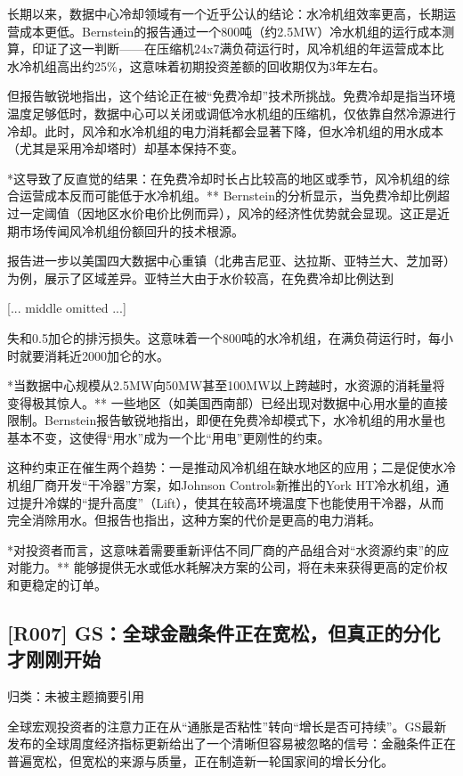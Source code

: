 \documentclass[11pt]{ctexart}
\begin{document}
长期以来，数据中心冷却领域有一个近乎公认的结论：水冷机组效率更高，长期运营成本更低。Bernstein的报告通过一个800吨（约2.5MW）冷水机组的运行成本测算，印证了这一判断——在压缩机24x7满负荷运行时，风冷机组的年运营成本比水冷机组高出约25\%，这意味着初期投资差额的回收期仅为3年左右。

但报告敏锐地指出，这个结论正在被“免费冷却”技术所挑战。免费冷却是指当环境温度足够低时，数据中心可以关闭或调低冷水机组的压缩机，仅依靠自然冷源进行冷却。此时，风冷和水冷机组的电力消耗都会显著下降，但水冷机组的用水成本（尤其是采用冷却塔时）却基本保持不变。

*这导致了反直觉的结果：在免费冷却时长占比较高的地区或季节，风冷机组的综合运营成本反而可能低于水冷机组。** Bernstein的分析显示，当免费冷却比例超过一定阈值（因地区水价电价比例而异），风冷的经济性优势就会显现。这正是近期市场传闻风冷机组份额回升的技术根源。

报告进一步以美国四大数据中心重镇（北弗吉尼亚、达拉斯、亚特兰大、芝加哥）为例，展示了区域差异。亚特兰大由于水价较高，在免费冷却比例达到

[... middle omitted ...]

失和0.5加仑的排污损失。这意味着一个800吨的水冷机组，在满负荷运行时，每小时就要消耗近2000加仑的水。

*当数据中心规模从2.5MW向50MW甚至100MW以上跨越时，水资源的消耗量将变得极其惊人。** 一些地区（如美国西南部）已经出现对数据中心用水量的直接限制。Bernstein报告敏锐地指出，即便在免费冷却模式下，水冷机组的用水量也基本不变，这使得“用水”成为一个比“用电”更刚性的约束。

这种约束正在催生两个趋势：一是推动风冷机组在缺水地区的应用；二是促使水冷机组厂商开发“干冷器”方案，如Johnson Controls新推出的York HT冷水机组，通过提升冷媒的“提升高度”（Lift），使其在较高环境温度下也能使用干冷器，从而完全消除用水。但报告也指出，这种方案的代价是更高的电力消耗。

*对投资者而言，这意味着需要重新评估不同厂商的产品组合对“水资源约束”的应对能力。** 能够提供无水或低水耗解决方案的公司，将在未来获得更高的定价权和更稳定的订单。

\subsection{[R007] GS：全球金融条件正在宽松，但真正的分化才刚刚开始}
{\small\color{refgray}归类：未被主题摘要引用}

全球宏观投资者的注意力正在从“通胀是否粘性”转向“增长是否可持续”。GS最新发布的全球周度经济指标更新给出了一个清晰但容易被忽略的信号：金融条件正在普遍宽松，但宽松的来源与质量，正在制造新一轮国家间的增长分化。
\end{document}

